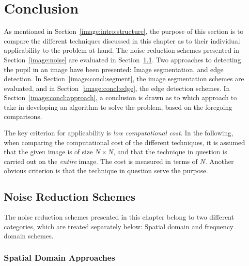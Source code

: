 
\section{Conclusion}
\label{image:concl}

As mentioned in Section~\ref{image:intro:structure}, the purpose of
this section is to compare the different techniques discussed in this
chapter as to their individual applicability to the problem at hand.
The noise reduction schemes presented in Section~\ref{image:noise} are
evaluated in Section~\ref{image:concl:noise}.  Two approaches to
detecting the pupil in an image have been presented: Image
segmentation, and edge detection.  In
Section~\ref{image:concl:segment}, the image segmentation schemes are
evaluated, and in Section~\ref{image:concl:edge}, the edge detection
schemes.  In Section~\ref{image:concl:approach}, a conclusion is drawn
as to which approach to take in developing an algorithm to solve the
problem, based on the foregoing comparisons.

The key criterion for applicability is {\em low computational cost\/}.
In the following, when comparing the computational cost of the
different techniques, it is assumed that the given image is of size
$N\times N$, and that the technique in question is carried out on the
{\em entire\/} image.  The cost is measured in terms of $N$.  Another
obvious criterion is that the technique in question serve the purpose.

\subsection{Noise Reduction Schemes}
\label{image:concl:noise}

The noise reduction schemes presented in this chapter belong to two
different categories, which are treated separately below: Spatial
domain and frequency domain schemes.

\subsubsection{Spatial Domain Approaches}

